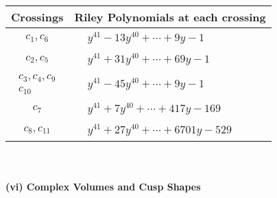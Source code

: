 \documentclass[1p]{elsarticle_modified}
\theoremstyle{definition}
\begin{document}
\begin{tabular}{m{50pt}|m{274pt}}
Crossings & \hspace{64pt}Riley Polynomials at each crossing \\
\hline $$\begin{aligned}c_{1},c_{6}\end{aligned}$$&$\begin{aligned}
&y^{41}-13 y^{40}+\cdots+9 y-1
\end{aligned}$\\
\hline $$\begin{aligned}c_{2},c_{5}\end{aligned}$$&$\begin{aligned}
&y^{41}+31 y^{40}+\cdots+69 y-1
\end{aligned}$\\
\hline $$\begin{aligned}c_{3},c_{4},c_{9}\\c_{10}\end{aligned}$$&$\begin{aligned}
&y^{41}-45 y^{40}+\cdots+9 y-1
\end{aligned}$\\
\hline $$\begin{aligned}c_{7}\end{aligned}$$&$\begin{aligned}
&y^{41}+7 y^{40}+\cdots+417 y-169
\end{aligned}$\\
\hline $$\begin{aligned}c_{8},c_{11}\end{aligned}$$&$\begin{aligned}
&y^{41}+27 y^{40}+\cdots+6701 y-529
\end{aligned}$\\
\hline
\end{tabular}\\~\\
\newpage\flushleft \textbf{(vi) Complex Volumes and Cusp Shapes}
\end{document}
